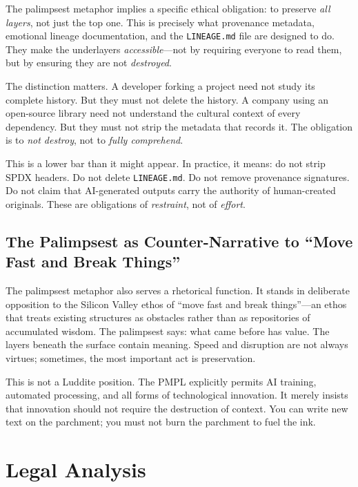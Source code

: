 \documentclass[11pt,twocolumn]{article}
\begin{document}
The palimpsest metaphor implies a specific ethical obligation: to
preserve \emph{all layers}, not just the top one. This is precisely what
provenance metadata, emotional lineage documentation, and the
\texttt{LINEAGE.md} file are designed to do. They make the underlayers
\emph{accessible}---not by requiring everyone to read them, but by
ensuring they are not \emph{destroyed}.

The distinction matters. A developer forking a project need not study its
complete history. But they must not delete the history. A company using
an open-source library need not understand the cultural context of every
dependency. But they must not strip the metadata that records it. The
obligation is to \emph{not destroy}, not to \emph{fully comprehend}.

This is a lower bar than it might appear. In practice, it means: do not
strip SPDX headers. Do not delete \texttt{LINEAGE.md}. Do not remove
provenance signatures. Do not claim that AI-generated outputs carry the
authority of human-created originals. These are obligations of
\emph{restraint}, not of \emph{effort}.

\subsection{The Palimpsest as Counter-Narrative to ``Move Fast and Break Things''}

The palimpsest metaphor also serves a rhetorical function. It stands in
deliberate opposition to the Silicon Valley ethos of ``move fast and
break things''---an ethos that treats existing structures as obstacles
rather than as repositories of accumulated wisdom. The palimpsest says:
what came before has value. The layers beneath the surface contain
meaning. Speed and disruption are not always virtues; sometimes, the
most important act is preservation.

This is not a Luddite position. The PMPL explicitly permits AI training,
automated processing, and all forms of technological innovation. It
merely insists that innovation should not require the destruction of
context. You can write new text on the parchment; you must not burn the
parchment to fuel the ink.

\section{Legal Analysis}
\label{sec:legal-analysis}
\end{document}
